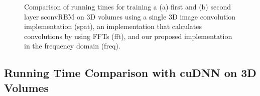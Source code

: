 \begin{figure}[t!]

\caption[Comparison of running times for training a sconvRBMs on 3D
images]{Comparison of running times for training a (a) first and (b) second
layer sconvRBM on 3D volumes using a single 3D image convolution implementation
(spat), an implementation that calculates convolutions by using FFTs (fft), and
our proposed implementation in the frequency domain (freq).}
\label{fig:run_oasis}
\end{figure}

\subsection{Running Time Comparison with cuDNN on 3D Volumes}


